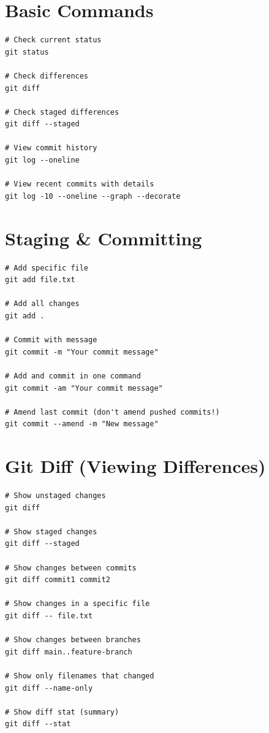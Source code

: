 \documentclass[12pt,a4paper]{article}
\begin{document}
\section{Basic Commands}
\begin{lstlisting}[style=bash]
# Check current status
git status

# Check differences
git diff

# Check staged differences
git diff --staged

# View commit history
git log --oneline

# View recent commits with details
git log -10 --oneline --graph --decorate
\end{lstlisting}

\section{Staging \& Committing}
\begin{lstlisting}[style=bash]
# Add specific file
git add file.txt

# Add all changes
git add .

# Commit with message
git commit -m "Your commit message"

# Add and commit in one command
git commit -am "Your commit message"

# Amend last commit (don't amend pushed commits!)
git commit --amend -m "New message"
\end{lstlisting}

\section{Git Diff (Viewing Differences)}
\begin{lstlisting}[style=bash]
# Show unstaged changes
git diff

# Show staged changes
git diff --staged

# Show changes between commits
git diff commit1 commit2

# Show changes in a specific file
git diff -- file.txt

# Show changes between branches
git diff main..feature-branch

# Show only filenames that changed
git diff --name-only

# Show diff stat (summary)
git diff --stat
\end{lstlisting}
\end{document}

